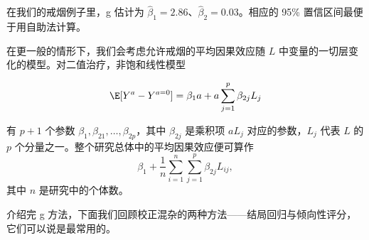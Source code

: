 在我们的戒烟例子里，g 估计为 $\hat\beta_1=2.86$、$\hat\beta_2=0.03$。相应的 95\% 置信区间最便于用自助法计算。


在更一般的情形下，我们会考虑允许戒烟的平均因果效应随 $L$ 中变量的一切层变化的模型。对二值治疗，非饱和线性模型

\[
\E[Y^a-Y^{a=0}]=\beta_1a+a\sum_{j=1}^{p}\beta_{2j}L_j
\]

有 $p+1$ 个参数 $\beta_1,\beta_{21},\dots,\beta_{2p}$，其中 $\beta_{2j}$ 是乘积项 $aL_j$ 对应的参数，$L_j$ 代表 $L$ 的 $p$ 个分量之一。整个研究总体中的平均因果效应便可算作
\[
\beta_1+\frac{1}{n}\sum_{i=1}^{n}\sum_{j=1}^{p}\beta_{2j}L_{ij},
\]
其中 $n$ 是研究中的个体数。

介绍完 g 方法，下面我们回顾校正混杂的两种方法——结局回归与倾向性评分，它们可以说是最常用的。


